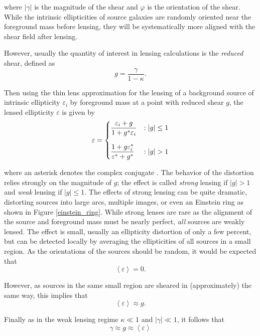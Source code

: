 \documentclass[%
 reprint,
 amsmath,amssymb,
 aps,nofootinbib
]{revtex4-1}
\begin{document}
\noindent where $|\gamma|$ is the magnitude of the shear and $\varphi$ is the orientation of the shear. While the intrinsic ellipticities of source galaxies are randomly oriented near the foreground mass before lensing, they will be systematically more aligned with the shear field after lensing.%

However, usually the quantity of interest in lensing calculations is the \textit{reduced} shear, defined as
\begin{equation}\label{reduced_shear}
g=\frac{\gamma}{1-\kappa}.
\end{equation}

\noindent Then using the thin lens approximation for the lensing of a background source of intrinsic ellipticity $\varepsilon_i$ by foreground mass at a point with reduced shear $g$, the lensed ellipticity $\varepsilon$ is given by
\begin{equation}\label{lensing}
 \varepsilon = \begin{dcases}
      \frac{\varepsilon_i+g}{1+g^*\varepsilon_i} & : |g|\leq1 \\[0.75em]
       \frac{1+g\varepsilon_i^*}{\varepsilon^*+g^*} & : |g|>1
   \end{dcases}
\end{equation}

\noindent where an asterisk denotes the complex conjugate \cite{schneider}. The behavior of the distortion relies strongly on the magnitude of $g$; the
effect is called \textit{strong} lensing if $|g|>1$ and \textit{weak} lensing if $|g|\leq1$. The effects of strong lensing can be quite dramatic, distorting sources into large arcs, multiple images, or even an Einstein ring as shown in Figure \ref{einstein_ring}. While strong lenses are rare as the alignment of the source and foreground mass must be nearly perfect, \textit{all} sources are weakly lensed. The effect is small, usually an ellipticity distortion of only a few percent, but can be detected locally by averaging the ellipticities of all sources in a small region. As the orientations of the sources should be random, it would be expected that
$$\left<\varepsilon\right>=0.$$

\noindent However, as sources in the same small region are sheared in (approximately) the same way, this implies that
\begin{equation}
\left<\varepsilon\right>\approx g.
\end{equation}

 \noindent Finally as in the weak lensing regime ${\kappa\ll1}$ and ${|\gamma|\ll1}$, it follows that
 \begin{equation}
 \gamma\approx g\approx\left<\varepsilon\right>
 \end{equation}
\end{document}
